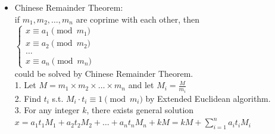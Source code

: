 \begin{itemize}[leftmargin=*]
\setlength\itemsep{0.2em}
\item Chinese Remainder Theorem:\\
if $m_1,m_2,\dots,m_n$ are coprime with each other, then\\
$\begin{cases}x\equiv a_1\pmod{m_1}\\x\equiv a_2\pmod{m_2}\\\dots\\x\equiv a_n\pmod{m_n}\end{cases}$\\
could be solved by Chinese Remainder Theorem.\\
1. Let $M=m_1\times m_2\times\dots\times m_n$ and let $M_i=\frac{M}{m_i}$\\
2. Find $t_i$ s.t. $M_i\cdot t_i\equiv1\pmod{m_i}$ by Extended Euclidean algorithm.\\
3. For any integer $k$, there exists general solution\\
$x=a_1t_1M_1+a_2t_2M_2+\dots+a_nt_nM_n+kM=kM+\sum\limits_{i=1}^na_it_iM_i$


\end{itemize}